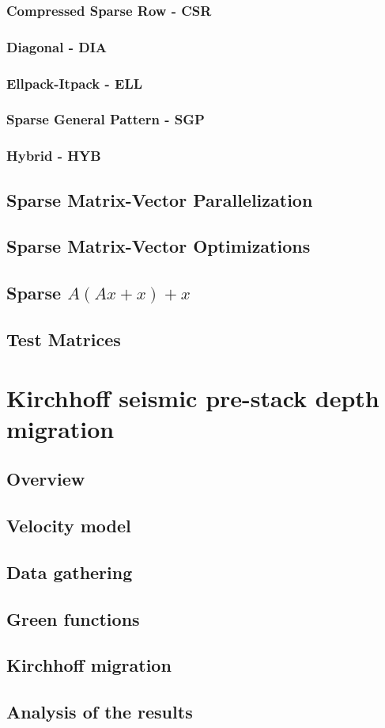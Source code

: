 \subsubsection{Compressed Sparse Row - CSR}
\subsubsection{Diagonal - DIA}
\subsubsection{Ellpack-Itpack - ELL}
\subsubsection{Sparse General Pattern - SGP}
\subsubsection{Hybrid - HYB}
\subsection{Sparse Matrix-Vector Parallelization}
\subsection{Sparse Matrix-Vector Optimizations}
\subsection{Sparse $A(Ax + x) + x$}
\subsection{Test Matrices}


\section{Kirchhoff seismic pre-stack depth migration}
\subsection{Overview}
\subsection{Velocity model}
\subsection{Data gathering}
\subsection{Green functions}
\subsection{Kirchhoff migration \label{sec:kirchhoff}}
\subsection{Analysis of the results}